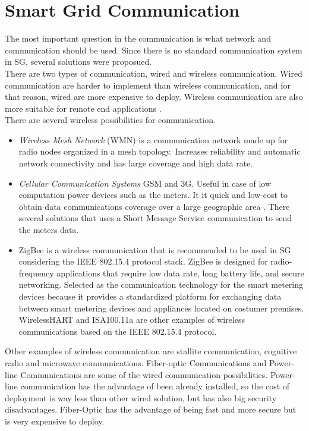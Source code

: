 \section{Smart Grid Communication}
The most important question in the communication is what network and communication should be used\cite{journals/comsur/FangMXY12}. Since there is no standard communication system in SG, several solutions were proposued.\\
There are two types of communication, wired and wireless communication. Wired communication are harder to implement than wireless communication, and for that reason, wired are more expensive to deploy.  Wireless communication are also more suitable for remote end applications \cite{parikh2010opportunities}.\\
There are several wireless possibilities for communication.\\
\begin{itemize}
  \item \textit{Wireless Mesh Network} (WMN) is a communication network made up for radio nodes organized in a mesh topology\cite{journals/comsur/FangMXY12}. Increases reliability and automatic network connectivity and has large coverage and high data rate.
\item \textit{Cellular Communication Systems}  GSM and 3G. Useful in case of low computation power devices such as the meters. It it quick and low-cost to obtain data communications coverage over a large geographic area \cite{akyol2010survey}. There several solutions that uses a Short Message Service communication to send the meters data.
\item {} ZigBee is a wireless communication that is recommended to be used in SG considering the IEEE 802.15.4 protocol stack\cite{parikh2010opportunities}. ZigBee is designed for radio-frequency applications that require low data rate, long battery life, and secure networking. Selected as the communication technology for the smart metering devices\cite{farhangi2010path} because it provides a standardized platform for exchanging data between smart metering devices and appliances located on costumer premises\cite{journals/comsur/FangMXY12}. WirelessHART and ISA100.11a are other examples of wireless communications based on the IEEE 802.15.4 protocol.
\end{itemize}
Other examples of wireless communication are stallite communication, cognitive radio and  microwave communications.
Fiber-optic Communications and Power-line Communications are some of the wired communication possibilities. Power-line communication has the advantage of been already installed, so the cost of deployment is way less than other wired solution, but has also big security disadvantages. Fiber-Optic has the advantage of being fast and more secure but is very expensive to deploy.\\



